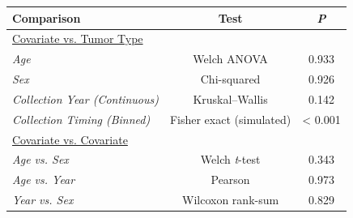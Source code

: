 \begin{tabular}{lcc}
\toprule[0.5pt]
\rule[-0.35em]{0pt}{1.25em}\fontsize{10pt}{12pt}\selectfont\textbf{Comparison} & \fontsize{10pt}{12pt}\selectfont\textbf{Test} & \fontsize{10pt}{12pt}\selectfont\textbf{\textit{P}} \\
\midrule[0.5pt]
\underline{Covariate vs. Tumor Type} &  &  \\
\hspace*{0.2cm}\textit{Age} & Welch ANOVA & 0.933 \\
\hspace*{0.2cm}\textit{Sex} & Chi-squared & 0.926 \\
\hspace*{0.2cm}\textit{Collection Year (Continuous)} & Kruskal--Wallis & 0.142 \\
\hspace*{0.2cm}\textit{Collection Timing (Binned)} & Fisher exact (simulated) & < 0.001 \\
\underline{Covariate vs. Covariate} &  &  \\
\hspace*{0.2cm}\textit{Age vs. Sex} & Welch \textit{t}-test & 0.343 \\
\hspace*{0.2cm}\textit{Age vs. Year} & Pearson & 0.973 \\
\hspace*{0.2cm}\textit{Year vs. Sex} & Wilcoxon rank-sum & 0.829 \\
\bottomrule[0.5pt]
\end{tabular}
